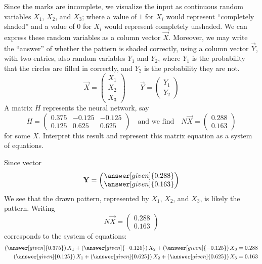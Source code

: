 \documentclass{ximera}
\begin{document}
\begin{example}
  
  Since the marks are incomplete, we visualize the input as continuous
  random variables $X_1$, $X_2$, and $X_3$; where a value of $1$ for
  $X_i$ would represent ``completely shaded'' and a value of $0$ for
  $X_i$ would represent completely unshaded. We can express these random
  variables as a column vector $\vec{X}$. Moreover, we may write the
  ``answer'' of whether the pattern is shaded correctly, using a column
  vector $\vec{Y}$, with two entries, also random variables $Y_1$ and
  $Y_2$, where $Y_1$ is the probability that the circles are filled in
  correctly, and $Y_2$ is the probability they are not.
  \[
  \vec{X} = \begin{pmatrix} X_1 \\ X_2 \\ X_3 \end{pmatrix} \qquad \vec{Y} = \begin{pmatrix} Y_1 \\ Y_2 \end{pmatrix}
  \]
  A matrix $H$ represents the neural network, say 
  \[
  H = \begin{pmatrix}
     0.375 & -0.125 & -0.125 \\
     0.125 & 0.625 & 0.625
  \end{pmatrix}
  \quad \text{and we find} \quad
  N\vec{X} =
  \begin{pmatrix}
    0.288 \\
    0.163
  \end{pmatrix}
  \]
  for some $X$.  Interpret this result and represent this matrix
  equation as a system of equations.
  \begin{explanation}
    Since vector
    \[
    \vec{Y} =
    \begin{pmatrix}
    \answer[given]{0.288} \\
    \answer[given]{0.163}
    \end{pmatrix}
    \]
    We see that the drawn pattern, represented by $X_1$, $X_2$, and
    $X_3$, is likely the
     pattern.
    Writing
    \[
    N\vec{X} =
  \begin{pmatrix}
    0.288 \\
    0.163
  \end{pmatrix}
  \]
  corresponds to the system of equations:
  \begin{align*}
    \left(\answer[given]{0.375}\right)X_1 +  \left(\answer[given]{-0.125}\right) X_2 + \left(\answer[given]{-0.125}\right) X_3 &= 0.288 \\
    \left(\answer[given]{0.125}\right)X_1 + \left(\answer[given]{0.625}\right) X_2+  \left(\answer[given]{0.625}\right)X_3 &= 0.163
  \end{align*}
  \end{explanation}
\end{example}
\end{document}
